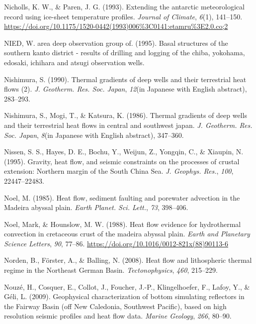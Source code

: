 \documentclass[draft,linenumbers]{agujournal2018}
\begin{document}
\leavevmode{}%
Nicholls, K. W., \& Paren, J. G. (1993). Extending the antarctic
meteorological record using ice-sheet temperature profiles.
\emph{Journal of Climate}, \emph{6}(1), 141--150.
\url{https://doi.org/10.1175/1520-0442(1993)006\%3C0141:etamru\%3E2.0.co;2}

\leavevmode{}%
NIED, W. area deep observation group of. (1995). Basal structures of the
southern kanto district - results of drilling and logging of the chiba,
yokohama, edosaki, ichihara and atsugi observation wells.

\leavevmode{}%
Nishimura, S. (1990). Thermal gradients of deep wells and their
terrestrial heat flows (2). \emph{J. Geotherm. Res. Soc. Japan},
\emph{12}(in Japanese with English abstract), 283--293.

\leavevmode{}%
Nishimura, S., Mogi, T., \& Katsura, K. (1986). Thermal gradients of
deep wells and their terrestrial heat flows in central and southwest
japan. \emph{J. Geotherm. Res. Soc. Japan}, \emph{8}(in Japanese with
English abstract), 347--360.

\leavevmode{}%
Nissen, S. S., Hayes, D. E., Bochu, Y., Weijun, Z., Yongqin, C., \&
Xiaupin, N. (1995). Gravity, heat flow, and seismic constraints on the
processes of crustal extension: Northern margin of the {South China
Sea}. \emph{J. Geophys. Res.}, \emph{100}, 22447--22483.

\leavevmode{}%
Noel, M. (1985). Heat flow, sediment faulting and porewater advection in
the {Madeira} abyssal plain. \emph{Earth Planet. Sci. Lett.}, \emph{73},
398--406.

\leavevmode{}%
Noel, Mark, \& Hounslow, M. W. (1988). Heat flow evidence for
hydrothermal convection in cretaceous crust of the madeira abyssal
plain. \emph{Earth and Planetary Science Letters}, \emph{90}, 77--86.
\url{https://doi.org/10.1016/0012-821x(88)90113-6}

\leavevmode{}%
Norden, B., Förster, A., \& Balling, N. (2008). Heat flow and
lithospheric thermal regime in the {Northeast German Basin}.
\emph{Tectonophysics}, \emph{460}, 215--229.

\leavevmode{}%
Nouzé, H., Cosquer, E., Collot, J., Foucher, J.-P., Klingelhoefer, F.,
Lafoy, Y., \& Géli, L. (2009). Geophysical characterization of bottom
simulating reflectors in the {Fairway Basin} (off {New Caledonia,
Southwest Pacific}), based on high resolution seismic profiles and heat
flow data. \emph{Marine Geology}, \emph{266}, 80--90.
\end{document}
